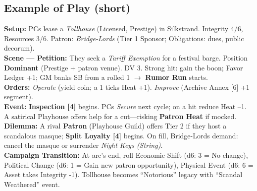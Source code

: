 \documentclass[10pt]{article}
\begin{document}
\begin{center}
    \section{Example of Play (short)}
    \textbf{Setup:} PCs lease a \emph{Tollhouse} (Licensed, Prestige) in Silkstrand. Integrity 4/6, Resources 3/6. Patron: \emph{Bridge-Lords} (Tier 1 Sponsor; Obligations: dues, public decorum).\\
    \textbf{Scene --- Petition:} They seek a \emph{Tariff Exemption} for a festival barge. Position \textbf{Dominant} (Prestige + patron venue). DV 3. Strong hit: gain the boon; Favor Ledger +1; GM banks SB from a rolled 1 $\to$ \textbf{Rumor Run} starts.\\
    \textbf{Orders:} \emph{Operate} (yield coin; a 1 ticks Heat +1). \emph{Improve} (Archive Annex [6] +1 segment).\\
    \textbf{Event:} \textbf{Inspection [4]} begins. PCs \emph{Secure} next cycle; on a hit reduce Heat --1. A satirical Playhouse offers help for a cut---risking \textbf{Patron Heat} if mocked.\\
    \textbf{Dilemma:} A rival \textbf{Patron} (Playhouse Guild) offers Tier 2 if they host a scandalous masque; \textbf{Split Loyalty [4]} begins. On fill, Bridge-Lords demand: cancel the masque or surrender \emph{Night Keys (String)}.\\
    \textbf{Campaign Transition:} At arc's end, roll Economic Shift (d6: 3 = No change), Political Change (d6: 1 = Gain new patron opportunity), Physical Event (d6: 6 = Asset takes Integrity -1). Tollhouse becomes ``Notorious'' legacy with ``Scandal Weathered'' event.
    

\end{center}
\end{document}
